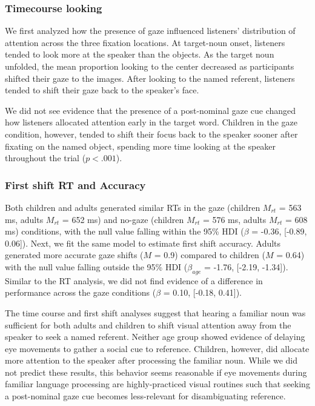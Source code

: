 \documentclass[10pt, letterpaper]{article}
\begin{document}
\hypertarget{timecourse-looking}{%
\subsubsection{Timecourse looking}\label{timecourse-looking}}

We first analyzed how the presence of gaze influenced listeners'
distribution of attention across the three fixation locations. At
target-noun onset, listeners tended to look more at the speaker than the
objects. As the target noun unfolded, the mean proportion looking to the
center decreased as participants shifted their gaze to the images. After
looking to the named referent, listeners tended to shift their gaze back
to the speaker's face.

We did not see evidence that the presence of a post-nominal gaze cue
changed how listeners allocated attention early in the target word.
Children in the gaze condition, however, tended to shift their focus
back to the speaker sooner after fixating on the named object, spending
more time looking at the speaker throughout the trial (\(p < .001\)).

\hypertarget{first-shift-rt-and-accuracy}{%
\subsubsection{First shift RT and
Accuracy}\label{first-shift-rt-and-accuracy}}

Both children and adults generated similar RTs in the gaze (children
\(M_{rt}\) = 563 ms, adults \(M_{rt}\) = 652 ms) and no-gaze (children
\(M_{rt}\) = 576 ms, adults \(M_{rt}\) = 608 ms) conditions, with the
null value falling within the 95\% HDI (\(\beta\) = -0.36, {[}-0.89,
0.06{]}). Next, we fit the same model to estimate first shift accuracy.
Adults generated more accurate gaze shifts (\(M\) = 0.9) compared to
children (\(M\) = 0.64) with the null value falling outside the 95\% HDI
(\(\beta_{age}\) = -1.76, {[}-2.19, -1.34{]}). Similar to the RT
analysis, we did not find evidence of a difference in performance across
the gaze conditions (\(\beta\) = 0.10, {[}-0.18, 0.41{]}).

The time course and first shift analyses suggest that hearing a familiar
noun was sufficient for both adults and children to shift visual
attention away from the speaker to seek a named referent. Neither age
group showed evidence of delaying eye movements to gather a social cue
to reference. Children, however, did allocate more attention to the
speaker after processing the familiar noun. While we did not predict
these results, this behavior seems reasonable if eye movements during
familiar language processing are highly-practiced visual routines such
that seeking a post-nominal gaze cue becomes less-relevant for
disambiguating reference.
\end{document}
